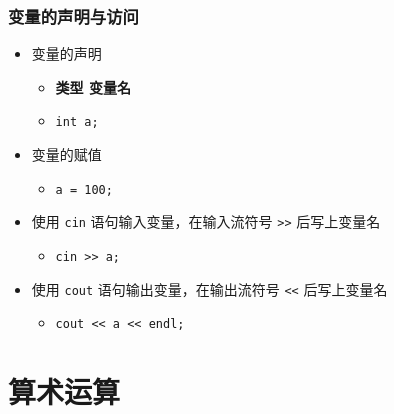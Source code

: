 \begin{frame}[fragile]
    \frametitle{变量的声明与访问}

    \begin{itemize}
        \item<1-> 变量的声明

            \begin{itemize}
                \item \textbf{类型 \enspace 变量名}
                \item \lstinline|int a;|
            \end{itemize}

        \item<2-> 变量的赋值

            \begin{itemize}
                \item \lstinline|a = 100;|
            \end{itemize}

        \item<3-> 使用 \lstinline|cin| 语句输入变量，在输入流符号 \lstinline|>>| 后写上变量名

            \begin{itemize}
                \item \lstinline|cin >> a;|
            \end{itemize}

        \item<4-> 使用 \lstinline|cout| 语句输出变量，在输出流符号 \lstinline|<<| 后写上变量名

            \begin{itemize}
                \item \lstinline|cout << a << endl;|
            \end{itemize}

    \end{itemize}
\end{frame}


\section{算术运算}

